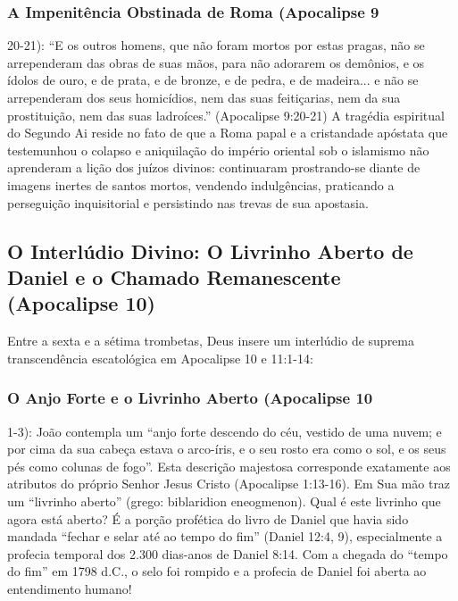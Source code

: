 \documentclass[11pt,a4paper,openany]{book}
\begin{document}
\subsubsection*{A Impenitência Obstinada de Roma (Apocalipse 9}
20-21):
``E os outros homens, que não foram mortos por estas pragas, não se arrependeram das obras de suas mãos, para não adorarem os demônios, e os ídolos de ouro, e de prata, e de bronze, e de pedra, e de madeira... e não se arrependeram dos seus homicídios, nem das suas feitiçarias, nem da sua prostituição, nem das suas ladroíces.'' (Apocalipse 9:20-21)
A tragédia espiritual do Segundo Ai reside no fato de que a Roma papal e a cristandade apóstata que testemunhou o colapso e aniquilação do império oriental sob o islamismo não aprenderam a lição dos juízos divinos: continuaram prostrando-se diante de imagens inertes de santos mortos, vendendo indulgências, praticando a perseguição inquisitorial e persistindo nas trevas de sua apostasia.



\subsection{O Interlúdio Divino: O Livrinho Aberto de Daniel e o Chamado Remanescente (Apocalipse 10)}


Entre a sexta e a sétima trombetas, Deus insere um interlúdio de suprema transcendência escatológica em Apocalipse 10 e 11:1-14:


\subsubsection*{O Anjo Forte e o Livrinho Aberto (Apocalipse 10}
1-3):
João contempla um ``anjo forte descendo do céu, vestido de uma nuvem; e por cima da sua cabeça estava o arco-íris, e o seu rosto era como o sol, e os seus pés como colunas de fogo''. Esta descrição majestosa corresponde exatamente aos atributos do próprio Senhor Jesus Cristo (Apocalipse 1:13-16).
Em Sua mão traz um ``livrinho aberto'' (grego: biblaridion eneogmenon). Qual é este livrinho que agora está aberto?
É a porção profética do livro de Daniel que havia sido mandada ``fechar e selar até ao tempo do fim'' (Daniel 12:4, 9), especialmente a profecia temporal dos 2.300 dias-anos de Daniel 8:14. Com a chegada do ``tempo do fim'' em 1798 d.C., o selo foi rompido e a profecia de Daniel foi aberta ao entendimento humano!
\end{document}
